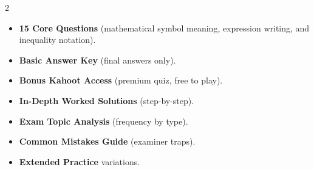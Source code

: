 \documentclass[11pt,a4paper]{article}
\newcommand{\FullReleaseDate}{April 30, 2026}
\begin{document}
\vspace{8pt}

\begin{multicols}{2}
  \begin{tcolorbox}[card, title=\sffamily\bfseries\textcolor{white}{\faHandPointDown\ TODAY (Simplified Version)}, colbacktitle=mainblue, boxed title style={sharp corners, boxrule=0pt}]
    \begin{itemize}[leftmargin=1.2em, itemsep=2pt]
      \item \small \textbf{15 Core Questions} (mathematical symbol meaning, expression writing, and inequality notation).
      \item \small \textbf{Basic Answer Key} (final answers only).
      \item \small \textbf{Bonus Kahoot Access} (premium quiz, free to play).
    \end{itemize}
  \end{tcolorbox}

  \columnbreak

  \begin{tcolorbox}[card, title=\sffamily\bfseries\textcolor{white}{\faRocket\ ON \FullReleaseDate\ (Full Upgrade)}, colbacktitle=mainblue, boxed title style={sharp corners, boxrule=0pt}]
    \begin{itemize}[leftmargin=1.2em, itemsep=2pt]
      \item \small \textbf{In-Depth Worked Solutions} (step-by-step).
      \item \small \textbf{Exam Topic Analysis} (frequency by type).
      \item \small \textbf{Common Mistakes Guide} (examiner traps).
      \item \small \textbf{Extended Practice} variations.
    \end{itemize}
  \end{tcolorbox}
\end{multicols}
\end{document}
